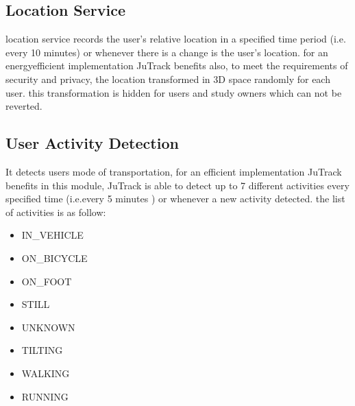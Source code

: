 \documentclass[letterpaper,10pt,english]{sphinxmanual}
\begin{document}
\begin{DUlineblock}{0em}
\item[] 
\end{DUlineblock}


\subsection{Location Service}
\label{\detokenize{JuTrack_Social:location-service}}\label{\detokenize{JuTrack_Social:labellocationservice}}
location service records the user’s relative location in a specified time period (i.e. every 10 minutes) or whenever there is a change is the user’s location.
for an energy\sphinxhyphen{}efficient implementation JuTrack benefits 
also, to meet the requirements of security and privacy, the location transformed in 3D space randomly for each user.
this transformation is hidden for users and study owners which can not be reverted.

\begin{DUlineblock}{0em}
\item[] 
\end{DUlineblock}


\subsection{User Activity Detection}
\label{\detokenize{JuTrack_Social:user-activity-detection}}\label{\detokenize{JuTrack_Social:labeluseractivitydetection}}
It detects users mode of transportation, for an efficient implementation JuTrack benefits 
in this module, JuTrack is able to detect up to 7 different activities every specified time (i.e.every 5 minutes ) or whenever a new activity detected.
the list of activities is as follow:
\begin{itemize}
\item {} 
IN\_VEHICLE

\item {} 
ON\_BICYCLE

\item {} 
ON\_FOOT

\item {} 
STILL

\item {} 
UNKNOWN

\item {} 
TILTING

\item {} 
WALKING

\item {} 
RUNNING

\end{itemize}
\end{document}
